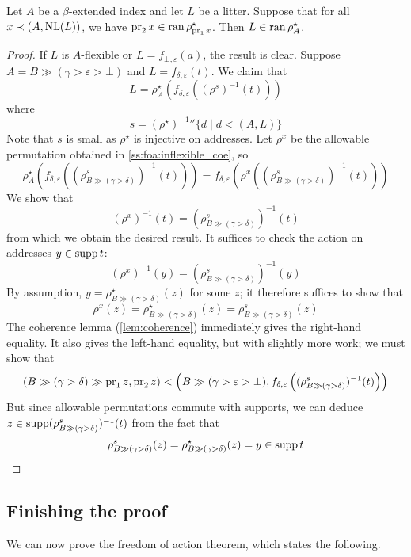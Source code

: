 \begin{lemma}
    Let \( A \) be a \( \beta \)-extended index and let \( L \) be a litter.
    Suppose that for all \( x \prec (A, \operatorname{NL}(L)) \), we have \( \operatorname{pr}_2 x \in \operatorname{ran} \rho^\star_{\operatorname{pr}_1 x} \).
    Then \( L \in \operatorname{ran} \rho^\star_A \).
\end{lemma}
\begin{proof}
    If \( L \) is \( A \)-flexible or \( L = f_{\bot,\varepsilon}(a) \), the result is clear.
    Suppose \( A = B \gg (\gamma > \varepsilon > \bot) \) and \( L = f_{\delta,\varepsilon}(t) \).
    We claim that
    \[ L = \rho^\star_A(f_{\delta,\varepsilon}((\rho^s)^{-1}(t))) \]
    where
    \[ s = {(\rho^\star)^{-1}} '' \{ d \mid d < (A, L) \} \]
    Note that \( s \) is small as \( \rho^\star \) is injective on addresses.
    Let \( \rho^x \) be the allowable permutation obtained in \cref{ss:foa:inflexible_coe}, so
    \[ \rho^\star_A\left(f_{\delta,\varepsilon}\left((\rho^s_{B \gg (\gamma > \delta)})^{-1}(t)\right)\right) = f_{\delta,\varepsilon}\left(\rho^x\left((\rho^s_{B \gg (\gamma > \delta)})^{-1}(t)\right)\right) \]
    We show that
    \[ (\rho^x)^{-1}(t) = \left(\rho^s_{B \gg (\gamma > \delta)}\right)^{-1}(t) \]
    from which we obtain the desired result.
    It suffices to check the action on addresses \( y \in \operatorname{supp} t \):
    \[ (\rho^x)^{-1}(y) = \left(\rho^s_{B \gg (\gamma > \delta)}\right)^{-1}(y) \]
    By assumption, \( y = \rho^\star_{B \gg (\gamma > \delta)}(z) \) for some \( z \); it therefore suffices to show that
    \[ \rho^x(z) = \rho^\star_{B \gg (\gamma > \delta)}(z) = \rho^s_{B \gg (\gamma > \delta)}(z) \]
    The coherence lemma (\cref{lem:coherence}) immediately gives the right-hand equality.
    It also gives the left-hand equality, but with slightly more work; we must show that
    \[ (B \gg (\gamma > \delta) \gg \operatorname{pr}_1 z, \operatorname{pr}_2 z) < \left(B \gg (\gamma > \varepsilon > \bot), f_{\delta,\varepsilon}\left((\rho^s_{B \gg (\gamma > \delta)})^{-1}(t)\right)\right) \]
    But since allowable permutations commute with supports, we can deduce \( z \in \operatorname{supp} (\rho^s_{B \gg (\gamma > \delta)})^{-1}(t) \) from the fact that
    \[ \rho^s_{B \gg (\gamma > \delta)}(z) = \rho^\star_{B \gg (\gamma > \delta)}(z) = y \in \operatorname{supp} t \]
\end{proof}

\subsection{Finishing the proof}

We can now prove the freedom of action theorem, which states the following.

